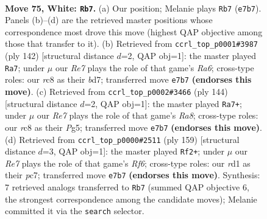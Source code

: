 \documentclass[11pt]{article}
\begin{document}
\clearpage

\begin{figure}[p]\centering
\begin{subfigure}{0.46\textwidth}\centering
\resizebox{\linewidth}{!}{%
\newchessgame
\chessboard[
  setfen={2r5/4R3/7k/8/5K2/8/7P/3r4 w - - 17 75},
  showmover=false,
  pgfstyle=straightmove, color=movearrow, markmove={e7-b7}
]}
\caption{}
\end{subfigure}\hfill
\begin{subfigure}{0.46\textwidth}\centering
\resizebox{\linewidth}{!}{%
\newchessgame
\chessboard[
  setfen={8/3b4/R7/4k2P/8/8/5K2/2r5 w - - 2 72},
  showmover=false,
  pgfstyle=straightmove, color=movearrow, markmove={a6-a7}
]}
\caption{}
\end{subfigure}
\\[4pt]
\begin{subfigure}{0.46\textwidth}\centering
\resizebox{\linewidth}{!}{%
\newchessgame
\chessboard[
  setfen={R7/4k3/8/6Pp/8/1r6/8/4K3 w - - 13 73},
  showmover=false,
  pgfstyle=straightmove, color=movearrow, markmove={a8-a7}
]}
\caption{}
\end{subfigure}\hfill
\begin{subfigure}{0.46\textwidth}\centering
\resizebox{\linewidth}{!}{%
\newchessgame
\chessboard[
  setfen={8/k1P5/6R1/p7/8/5r2/1K6/8 b - - 0 80},
  showmover=false,
  pgfstyle=straightmove, color=movearrow, markmove={f3-f2}
]}
\caption{}
\end{subfigure}
\caption{\textbf{Move 75, White: \texttt{Rb7}.} (a) Our position; Melanie plays \texttt{Rb7} (\texttt{e7b7}). Panels (b)--(d) are the retrieved master positions whose correspondence most drove this move (highest QAP objective among those that transfer to it). (b) Retrieved from \texttt{ccrl\_top\_p0001\#3987} (ply 142) [structural distance $d$=2, QAP obj=1]: the master played \texttt{Ra7}; under $\mu$ our \emph{Re7} plays the role of that game's \emph{Ra6}; cross-type roles: our \emph{r}c8 as their \emph{b}d7; transferred move \texttt{e7b7} \textbf{(endorses this move)}. (c) Retrieved from \texttt{ccrl\_top\_p0002\#3466} (ply 144) [structural distance $d$=2, QAP obj=1]: the master played \texttt{Ra7+}; under $\mu$ our \emph{Re7} plays the role of that game's \emph{Ra8}; cross-type roles: our \emph{r}c8 as their \emph{P}g5; transferred move \texttt{e7b7} \textbf{(endorses this move)}. (d) Retrieved from \texttt{ccrl\_top\_p0000\#2511} (ply 159) [structural distance $d$=3, QAP obj=1]: the master played \texttt{Rf2+}; under $\mu$ our \emph{Re7} plays the role of that game's \emph{Rf6}; cross-type roles: our \emph{r}d1 as their \emph{p}c7; transferred move \texttt{e7b7} \textbf{(endorses this move)}. Synthesis: 7 retrieved analogs transferred to \texttt{Rb7} (summed QAP objective 6, the strongest correspondence among the candidate moves); Melanie committed it via the \texttt{search} selector.}
\label{fig:thought-m148}
\end{figure}
\end{document}

